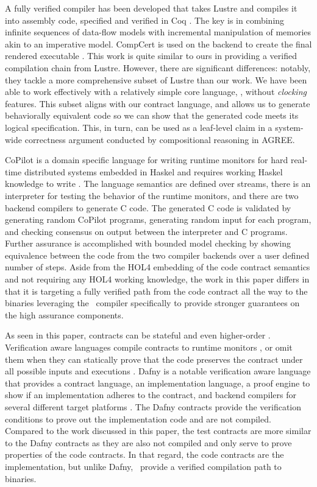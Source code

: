 A fully verified compiler has been developed that takes Lustre and compiles
it into assembly code, specified and verified in Coq \cite{10.1145/3140587.3062358}.
The key is in combining infinite sequences of data-flow models with incremental
manipulation of memories akin to an imperative model. CompCert is used on the
backend to create the final rendered executable \cite{compcert}. 
This work is quite similar to
ours in providing a verified compilation chain from Lustre. However,
there are significant differences: notably, they tackle a more
comprehensive subset of Lustre than our work. We have been able to
work effectively with a relatively simple core language, \eg, without
\emph{clocking} features.  This subset aligns with our contract language, and
allows us to generate behaviorally equivalent code so we can show that the
generated code meets its logical specification.  This, in turn,
can be used as a leaf-level claim in a system-wide correctness argument
conducted by compositional reasoning in AGREE.

CoPilot is a domain specific language for writing runtime monitors for hard real-time distributed systems embedded in Haskel and requires working Haskel knowledge to write \cite{10.1007/s11334-013-0223-x}.
The language semantics are defined over streams, there is an interpreter for testing the behavior of the runtime monitors, and there are two backend compilers to generate C code.
The generated C code is validated by generating random CoPilot programs, generating random input for each program, and checking consensus on output between the interpreter and C programs.
Further assurance is accomplished with bounded model checking by showing equivalence between the code from the two compiler backends over a user defined number of steps.
Aside from the HOL4 embedding of the code contract semantics and not requiring any HOL4 working knowledge, the work in this paper differs in that it is targeting a fully verified path from the code contract all the way to the binaries leveraging the \ckml\ compiler specifically to provide stronger guarantees on the high assurance components.

As seen in this paper, contracts can be stateful and even higher-order \cite{10.1145/583852.581484}. 
Verification aware languages compile contracts to runtime monitors \cite{10.1007/978-3-642-28869-2_11}, or omit them when they can statically prove that the code preserves the contract under all possible inputs and executions \cite{10.1145/3158139}. Dafny is a notable verification aware language that provides a contract language, an implementation language, a proof engine to show if an implementation adheres to the contract, and backend compilers for several different target platforms \cite{dafny}.
The Dafny contracts provide the verification conditions to prove out the implementation code and are not compiled.
Compared to the work discussed in this paper, the test contracts are more similar to the Dafny contracts as they are also not compiled and only serve to prove properties of the code contracts.
In that regard, the code contracts are the implementation, but unlike Dafny, \ckml\ provide a verified compilation path to binaries.
